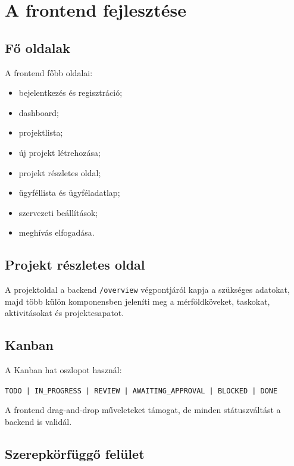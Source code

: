 \documentclass[11pt,a4paper]{report}
\begin{document}
    \chapter{A frontend fejlesztése}

    \section{Fő oldalak}

    A frontend főbb oldalai:
    \begin{itemize}
        \item bejelentkezés és regisztráció;
        \item dashboard;
        \item projektlista;
        \item új projekt létrehozása;
        \item projekt részletes oldal;
        \item ügyféllista és ügyféladatlap;
        \item szervezeti beállítások;
        \item meghívás elfogadása.
    \end{itemize}

    \section{Projekt részletes oldal}

    A projektoldal a backend \texttt{/overview} végpontjáról kapja a szükséges
    adatokat, majd több külön komponensben jeleníti meg a mérföldköveket, taskokat,
    aktivitásokat és projektcsapatot.

    \section{Kanban}

    A Kanban hat oszlopot használ:
    \begin{center}
        \texttt{TODO | IN\_PROGRESS | REVIEW | AWAITING\_APPROVAL | BLOCKED | DONE}
    \end{center}

    A frontend drag-and-drop műveleteket támogat, de minden státuszváltást a backend
    is validál.

    \section{Szerepkörfüggő felület}
\end{document}
